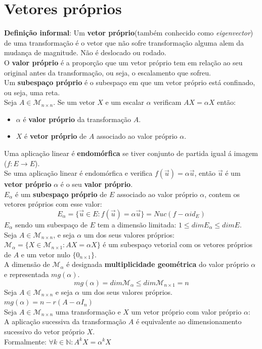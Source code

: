 \documentclass[]{report}
\begin{document}
\section{Vetores próprios}
\textbf{Definição informal}: Um \textbf{vetor próprio}(também conhecido como \textit{eigenvector}) de uma transformação é o vetor que não sofre transformação alguma alem da mudança de magnitude. Não é deslocado ou rodado.\\
O \textbf{valor próprio} é a proporção que um vetor próprio tem em relação ao seu original antes da transformação, ou seja, o escalamento que sofreu.\\
Um \textbf{subespaço próprio} é o subespaço em que um vetor próprio está confinado, ou seja, uma reta.\\[5mm]
Seja $A \in \mathcal{M}_{n \times n}$. Se um vetor $X$ e um escalar $\alpha$ verificam $AX = \alpha X$ então:
\begin{itemize}
\item $\alpha$ é \textbf{valor próprio} da transformação $A$.
\item $X$ é \textbf{vetor próprio} de $A$ associado ao valor próprio $\alpha$.
\end{itemize}
Uma aplicação linear é \textbf{endomórfica} se tiver conjunto de partida igual á imagem ($f: E \to E$).\\
Se uma aplicação linear é endomórfica e verifica $f(\vec u)= \alpha \vec u$, então $\vec u$ é um \textbf{vetor próprio} $\alpha$ é o seu \textbf{valor próprio}.\\
$E_\alpha$ é um \textbf{subespaço próprio} de $E$ associado ao valor próprio $\alpha$, contem os vetores próprios com esse valor:
$$E_\alpha = \{\vec u \in E : f(\vec u) = \alpha \vec u\} = Nuc(f-\alpha id_E)$$
$E_\alpha$ sendo um subespaço de $E$ tem a dimensão limitada: $1 \leq dim E_\alpha \leq dim E$.\\[2mm]
Seja $A \in \mathcal{M}_{n \times n}$, e seja $\alpha$ um dos seus valores próprios:\\
$\mathcal{M}_\alpha = \{X \in \mathcal{M}_{n \times 1} : AX = \alpha X\}$ é um subespaço vetorial com os vetores próprios de $A$ e um vetor nulo $\{0_{n \times 1}\}$.\\
A dimensão de $\mathcal{M}_{\alpha}$ é designada \textbf{multiplicidade geométrica} do valor próprio $\alpha$ e representada $mg(\alpha)$.
$$mg(\alpha) = dim \mathcal{M}_\alpha \leq dim \mathcal{M}_{n \times 1} = n$$
Seja $A \in \mathcal{M}_{n \times n}$ e seja $\alpha$ um dos seus valores próprios.\\
$mg(\alpha) = n - r(A - \alpha I_n)$\\[2mm]
Seja $A \in \mathcal{M}_{n \times n}$ uma transformação e $X$ um vetor próprio com valor próprio $\alpha$:\\
A aplicação sucessiva da transformação $A$ é equivalente ao dimensionamento sucessivo do vetor próprio $X$.\\
Formalmente: $\forall k \in \mathbb{N} : A^k X = \alpha^k X$
\end{document}
